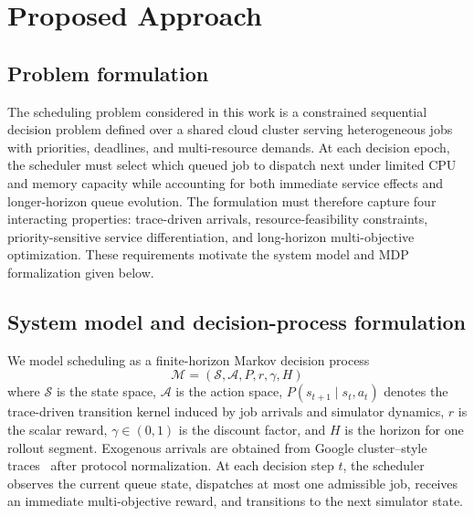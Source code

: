 \documentclass[journal]{IEEEtran}
\begin{document}
\section{\textbf{Proposed Approach}} \label{Sec3}

\subsection{Problem formulation}
The scheduling problem considered in this work is a constrained sequential decision problem defined over a shared cloud cluster serving heterogeneous jobs with priorities, deadlines, and multi-resource demands. At each decision epoch, the scheduler must select which queued job to dispatch next under limited CPU and memory capacity while accounting for both immediate service effects and longer-horizon queue evolution. The formulation must therefore capture four interacting properties: trace-driven arrivals, resource-feasibility constraints, priority-sensitive service differentiation, and long-horizon multi-objective optimization. These requirements motivate the system model and MDP formalization given below.

\subsection{System model and decision-process formulation}
We model scheduling as a finite-horizon Markov decision process
\begin{equation}
\mathcal{M} = (\mathcal{S}, \mathcal{A}, P, r, \gamma, H)
\end{equation}
where $\mathcal{S}$ is the state space, $\mathcal{A}$ is the action space, $P(s_{t+1}\mid s_t,a_t)$ denotes the trace-driven transition kernel induced by job arrivals and simulator dynamics, $r$ is the scalar reward, $\gamma \in (0,1)$ is the discount factor, and $H$ is the horizon for one rollout segment. Exogenous arrivals are obtained from Google cluster--style traces~\cite{reiss2011googlecluster} after protocol normalization. At each decision step $t$, the scheduler observes the current queue state, dispatches at most one admissible job, receives an immediate multi-objective reward, and transitions to the next simulator state.
\end{document}
